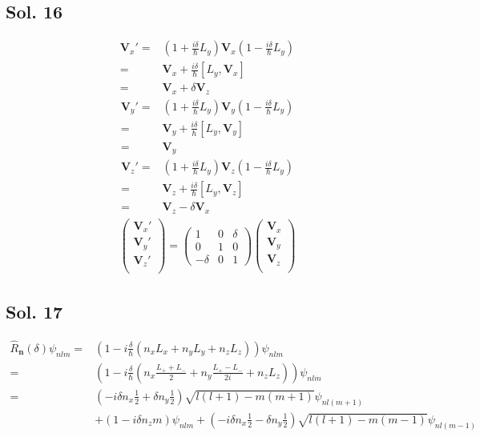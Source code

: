 \subsection*{Sol. 16}
\begin{align*}
    \bm V_x' =& (1+\frac{i\delta}{\hbar}L_y)\bm V_x(1-\frac{i\delta}{\hbar}L_y)\\
    =&\bm V_x+\frac{i\delta}{\hbar}[L_y, \bm V_x]\\
    =&\bm V_x + \delta \bm V_z
\end{align*}
\begin{align*}
    \bm V_y' =& (1+\frac{i\delta}{\hbar}L_y)\bm V_y(1-\frac{i\delta}{\hbar}L_y)\\
    =&\bm V_y+\frac{i\delta}{\hbar}[L_y, \bm V_y]\\
    =&\bm V_y 
\end{align*}
\begin{align*}
    \bm V_z' =& (1+\frac{i\delta}{\hbar}L_y)\bm V_z(1-\frac{i\delta}{\hbar}L_y)\\
    =&\bm V_z+\frac{i\delta}{\hbar}[L_y, \bm V_z]\\
    =&\bm V_z - \delta \bm V_x
\end{align*}
\begin{align*}
    \begin{pmatrix}
        \bm V_x'\\
        \bm V_y'\\
        \bm V_z'\\
    \end{pmatrix}
    =
    \begin{pmatrix}
        1 & 0 & \delta \\
        0 & 1 & 0 \\
        -\delta & 0 & 1 
    \end{pmatrix}
    \begin{pmatrix}
        \bm V_x\\
        \bm V_y\\
        \bm V_z\\
    \end{pmatrix}
\end{align*}

\subsection*{Sol. 17}
\begin{align*}
    \hat R_{\bm n}(\delta)\psi_{nlm}
    =&(1-i\frac{\delta}{\hbar}(n_xL_x+n_yL_y+n_zL_z))\psi_{nlm}\\
    =&(1-i\frac{\delta}{\hbar}(n_x\frac{L_++L_-}{2}+n_y\frac{L_+-L_-}{2i}+n_zL_z))\psi_{nlm}\\
    =&
    (-i\delta n_x\frac{1}{2}+\delta n_y\frac{1}{2})\sqrt{l(l+1)-m(m+1)}\psi_{nl(m+1)}\\
    &+ (1-i\delta n_zm)\psi_{nlm} + 
    (-i\delta n_x\frac{1}{2}-\delta n_y\frac{1}{2})\sqrt{l(l+1)-m(m-1)}\psi_{nl(m-1)}
\end{align*}

